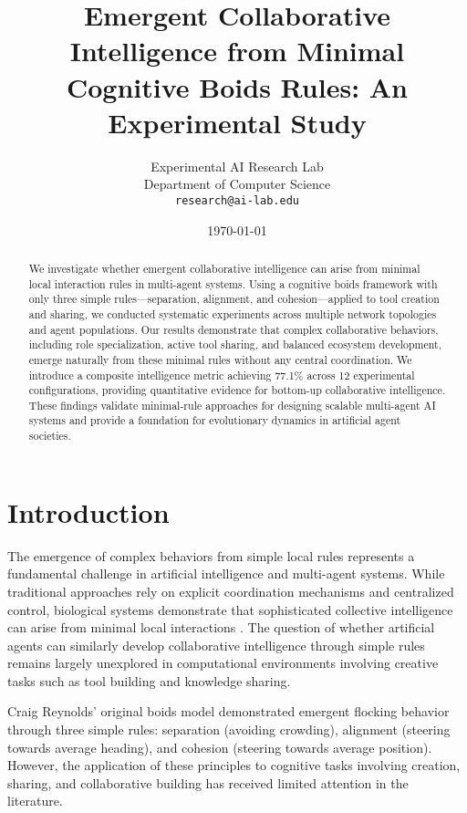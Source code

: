 \documentclass[10pt,twocolumn]{article}
\title{Emergent Collaborative Intelligence from Minimal Cognitive Boids Rules: An Experimental Study}
\author{
Experimental AI Research Lab\\
Department of Computer Science\\
\texttt{research@ai-lab.edu}
}
\date{\today}
\begin{document}
\maketitle

\begin{abstract}
We investigate whether emergent collaborative intelligence can arise from minimal local interaction rules in multi-agent systems. Using a cognitive boids framework with only three simple rules—separation, alignment, and cohesion—applied to tool creation and sharing, we conducted systematic experiments across multiple network topologies and agent populations. Our results demonstrate that complex collaborative behaviors, including role specialization, active tool sharing, and balanced ecosystem development, emerge naturally from these minimal rules without any central coordination. We introduce a composite intelligence metric achieving 77.1\% across 12 experimental configurations, providing quantitative evidence for bottom-up collaborative intelligence. These findings validate minimal-rule approaches for designing scalable multi-agent AI systems and provide a foundation for evolutionary dynamics in artificial agent societies.
\end{abstract}

\section{Introduction}

The emergence of complex behaviors from simple local rules represents a fundamental challenge in artificial intelligence and multi-agent systems. While traditional approaches rely on explicit coordination mechanisms and centralized control, biological systems demonstrate that sophisticated collective intelligence can arise from minimal local interactions \cite{reynolds1987flocks}. The question of whether artificial agents can similarly develop collaborative intelligence through simple rules remains largely unexplored in computational environments involving creative tasks such as tool building and knowledge sharing.

Craig Reynolds' original boids model \cite{reynolds1987flocks} demonstrated emergent flocking behavior through three simple rules: separation (avoiding crowding), alignment (steering towards average heading), and cohesion (steering towards average position). However, the application of these principles to cognitive tasks involving creation, sharing, and collaborative building has received limited attention in the literature.
\end{document}

